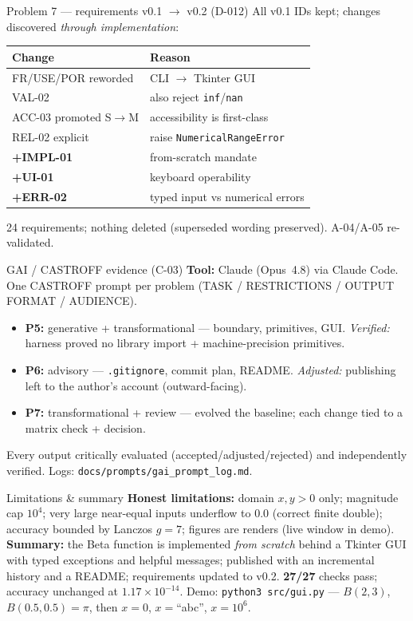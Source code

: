 \documentclass[aspectratio=169]{beamer}
\begin{document}
\begin{frame}{Problem 7 --- requirements v0.1 $\rightarrow$ v0.2 (D-012)}
All v0.1 IDs kept; changes discovered \emph{through implementation}:
\begin{center}\small
\begin{tabular}{@{}ll@{}}
\toprule
Change & Reason\\
\midrule
FR/USE/POR reworded & CLI $\rightarrow$ Tkinter GUI\\
VAL-02 & also reject \texttt{inf}/\texttt{nan}\\
ACC-03 promoted S$\rightarrow$M & accessibility is first-class\\
REL-02 explicit & raise \texttt{NumericalRangeError}\\
\textbf{+IMPL-01} & from-scratch mandate\\
\textbf{+UI-01} & keyboard operability\\
\textbf{+ERR-02} & typed input vs numerical errors\\
\bottomrule
\end{tabular}
\end{center}
\footnotesize 24 requirements; nothing deleted (superseded wording preserved). A-04/A-05 re-validated.
\end{frame}

\begin{frame}{GAI / CASTROFF evidence (C-03)}
\textbf{Tool:} Claude (Opus~4.8) via Claude Code. One CASTROFF prompt per problem
(TASK / RESTRICTIONS / OUTPUT FORMAT / AUDIENCE).
\begin{itemize}\small
  \item \textbf{P5:} generative + transformational --- boundary, primitives, GUI. \emph{Verified:} harness proved no library import + machine-precision primitives.
  \item \textbf{P6:} advisory --- \texttt{.gitignore}, commit plan, README. \emph{Adjusted:} publishing left to the author's account (outward-facing).
  \item \textbf{P7:} transformational + review --- evolved the baseline; each change tied to a matrix check + decision.
\end{itemize}
\footnotesize Every output critically evaluated (accepted/adjusted/rejected) and independently
verified. Logs: \texttt{docs/prompts/gai\_prompt\_log.md}.
\end{frame}

\begin{frame}{Limitations \& summary}
\textbf{Honest limitations:} domain $x,y>0$ only; magnitude cap $10^4$; very large
near-equal inputs underflow to $0.0$ (correct finite double); accuracy bounded by
Lanczos $g{=}7$; figures are renders (live window in demo).
\vfill
\textbf{Summary:} the Beta function is implemented \emph{from scratch} behind a Tkinter GUI
with typed exceptions and helpful messages; published with an incremental history and a
README; requirements updated to v0.2. \textbf{27/27} checks pass; accuracy unchanged at
$1.17\times10^{-14}$.
\vfill
\centering\small Demo: \texttt{python3 src/gui.py} --- $B(2,3)$, $B(0.5,0.5){=}\pi$, then $x{=}0$, $x{=}$``abc'', $x{=}10^6$.
\end{frame}
\end{document}
